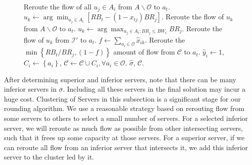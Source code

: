 \documentclass[journal]{IEEEtran}
\begin{document}
\begin{figure}[!t]
\begin{algorithm}[H]
\begin{algorithmic}[1]
			\STATE Reroute the flow of all $u_j\in A_i$ from $A \backslash \mathcal{O}$ to $a_t$. 
			\ENDIF
			\STATE $u_k \leftarrow \arg\min_{u_j \in A_t}\left[RB_t - (1-x_{tj})BR_j\right]$.
			\STATE Reroute the flow of $u_k$ from $A \backslash \mathcal{O}$ to $a_t$.
			\ENDWHILE
			\ENDIF
			\STATE $u_k \leftarrow \arg\max_{u_j \in A_t : BR_j \le BW_t}BR_j$.
			\STATE Reroute the flow of $u_k$ from $\mathcal{I}'$ to $a_t$.
			\STATE $f \leftarrow \sum\nolimits_{{a_i} \in \mathcal{O}} {{{\widehat x}_{ik}}} $.
			\STATE Reroute the $\min \left\{RB_t/BR_j, (1-f)\right\}$ amount of flow from $\mathcal{C}$ to $a_t$.
			\ENDIF
			\ENDIF
			\ENDWHILE
			\STATE $\widehat y_i \leftarrow 1$, $ C_i \leftarrow \left\{a_i\right\} $, $\mathcal{C} \leftarrow \mathcal{C} \cup C_i , \forall a_i \in \mathcal{O}$. 
			\RETURN $\widehat{\sigma}$, $\mathcal{C}$.
		\end{algorithmic}
	\end{algorithm}
\end{figure}
After determining superior and inferior servers, note that there can be many inferior servers in $\overline{\sigma}$.  Including all these servers in the final solution may incur a huge cost. Clustering of Servers in this subsection is a significant stage for our rounding algorithm. We use a reasonable strategy based on rerouting flow from some servers to others to select a small number of servers. For a selected inferior server, we will reroute as much flow as possible from other intersecting servers, such that it frees up some capacity at those servers. For a superior server, if we can reroute all flow from an inferior server that intersects it, we add this inferior server to the cluster led by it. 
\end{document}
